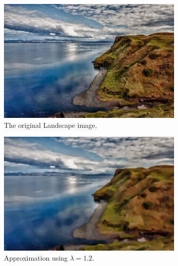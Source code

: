 \documentclass[abstracton]{scrreprt}
\begin{document}
            \begin{figure}[!ht]
                \centering
                \begin{subfigure}[b]{0.32\textwidth}
                    \includegraphics[width=\textwidth]{img/images/landscape.png}
                    \caption{The original Landscape image.}
                \end{subfigure}
                \begin{subfigure}[b]{0.32\textwidth}
                    \includegraphics[width=\textwidth]{img/approximation/12landscape.png}
                    \caption{Approximation using $\lambda = 1.2$.}
                \end{subfigure}
                \begin{subfigure}[b]{0.32\textwidth}

\end{subfigure}
\end{figure}
\end{document}
